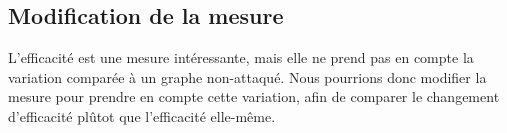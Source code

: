 \subsection{Modification de la mesure}
L'efficacité est une mesure intéressante, mais elle ne prend pas en compte la variation comparée à un graphe non-attaqué.
Nous pourrions donc modifier la mesure pour prendre en compte cette variation, afin de comparer le changement d'efficacité plûtot que l'efficacité elle-même.